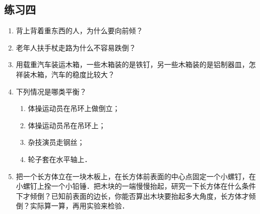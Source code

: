 \subsection*{练习四}
\begin{enumerate}
	\item 背上背着重东西的人，为什么要向前倾？
	\item 老年人扶手杖走路为什么不容易跌倒？
	\item 用载重汽车装运木箱，一些木箱装的是铁钉，另一些木箱装的是铝制器皿，怎祥装木箱，汽车的稳度比较大？
	\item 下列情况是哪类平衡？
	      \begin{enumerate}
		      \item 体操运动员在吊环上做倒立；
		      \item 体操运动员吊在吊环上；
		      \item 杂技演员走钢丝；
		      \item 轮子套在水平轴上．
	      \end{enumerate}
	\item 把一个长方体立在一块木板上，在长方体前表面的中心点固定一个小螺钉，在小螺钉上拴一个小铅锤．把木块的一端慢慢抬起，研究一下长方体在什么条件下才倾倒？已知前表面的边长，你能否算出木块要抬起多大角度，长方体才倾倒？实际算一算，再用实验来检验．
\end{enumerate}
\newpage
